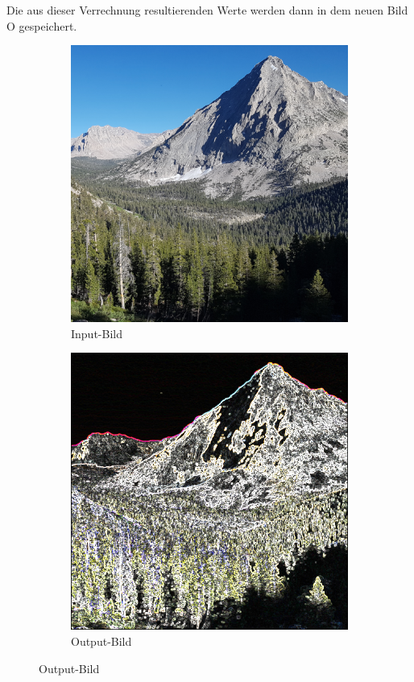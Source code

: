 \documentclass[course=erap]{aspdoc}
\begin{document}
Die aus dieser Verrechnung resultierenden Werte werden dann in dem neuen Bild O gespeichert.
\begin{figure}[H]
    \begin{subfigure}{.5\columnwidth}
        \centering
        \includegraphics[width=\columnwidth]{graphics/johnmuirtrail.png}
        \caption{Input-Bild}
        \label{fig:input-bild}
    \end{subfigure}
    \begin{subfigure}{.5\columnwidth}
        \centering
        \includegraphics[width=\columnwidth]{graphics/johnmuirtrail_sobel.png}
        \caption{Output-Bild}
        \label{fig:output-bild}
    \end{subfigure}
\end{figure}
\end{document}
